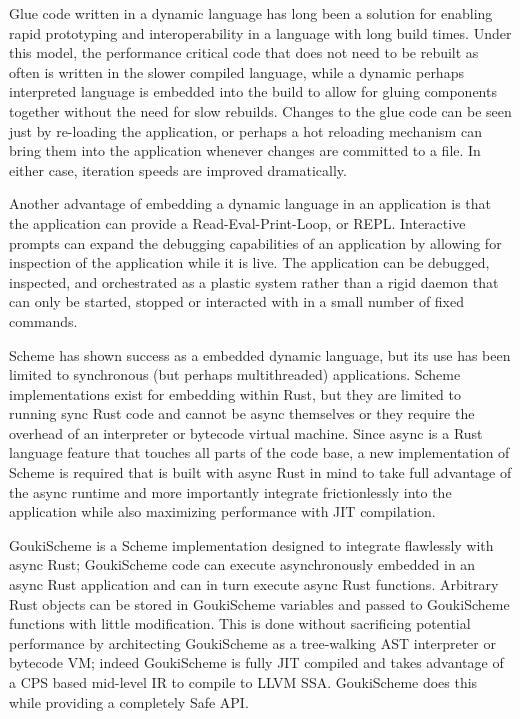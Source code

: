 \documentclass[sigplan,review,anonymous]{acmart}
\begin{document}
Glue code written in a dynamic language has long been a solution for enabling
rapid prototyping and interoperability in a language with long build times. Under
this model, the performance critical code that does not need to be rebuilt as
often is written in the slower compiled language, while a dynamic perhaps
interpreted language is embedded into the build to allow for gluing components
together without the need for slow rebuilds. Changes to the glue code can be
seen just by re-loading the application, or perhaps a hot reloading mechanism
can bring them into the application whenever changes are committed to a file. In
either case, iteration speeds are improved dramatically.

Another advantage of embedding a dynamic language in an application is that the
application can provide a Read-Eval-Print-Loop, or REPL. Interactive prompts can
expand the debugging capabilities of an application by allowing for inspection of
the application while it is live. The application can be debugged, inspected, and
orchestrated as a plastic system rather than a rigid daemon that can only be
started, stopped or interacted with in a small number of fixed commands.

Scheme has shown success as a embedded dynamic language, but its use has been
limited to synchronous (but perhaps multithreaded) applications. Scheme
implementations exist for embedding within Rust, but they are limited to running
sync Rust code and cannot be async themselves or they require the overhead of an
interpreter or bytecode virtual machine. Since async is a Rust language feature
that touches all parts of the code base, a new implementation of Scheme
is required that is built with async Rust in mind to take full advantage of the
async runtime and more importantly integrate frictionlessly into the application
while also maximizing performance with JIT compilation.

GoukiScheme\cite{gouki} is a Scheme implementation designed to integrate
flawlessly with async Rust; GoukiScheme code can execute asynchronously embedded
in an async Rust application and can in turn execute async Rust functions.
Arbitrary Rust objects can be stored in GoukiScheme variables and passed to
GoukiScheme functions with little modification. This is done without sacrificing
potential performance by architecting GoukiScheme as a tree-walking AST
interpreter or bytecode VM; indeed GoukiScheme is fully JIT compiled and takes
advantage of a CPS based mid-level IR to compile to LLVM SSA. GoukiScheme does
this while providing a completely Safe API.
\end{document}
